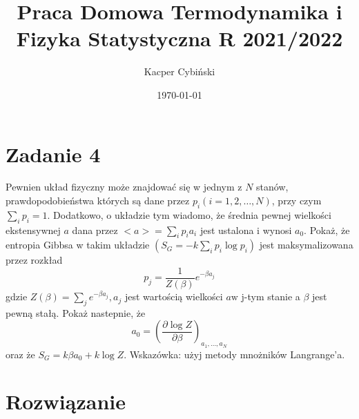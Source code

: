 \documentclass[12pt,a4paper]{article}
\title{Praca Domowa Termodynamika i Fizyka Statystyczna R 2021/2022}
\author{Kacper Cybiński}
\date{\today}
\begin{document}
\maketitle

\section{Zadanie 4}

Pewnien układ fizyczny może znajdować się w jednym z $N$ stanów, prawdopodobieństwa których są dane przez $p_{i}(i=1,2, \ldots, N)$, przy czym $\sum_{i} p_{i}=1$. Dodatkowo, o układzie tym wiadomo, że średnia pewnej wielkości ekstensywnej $a$ dana przez $<a>=\sum_{i} p_{i} a_{i}$ jest ustalona i wynosi $a_{0}$. Pokaż, że entropia Gibbsa w takim układzie $\left(S_{G}=-k \sum_{i} p_{i} \log p_{i}\right)$ jest maksymalizowana przez rozkład
$$
p_{j}=\frac{1}{Z(\beta)} e^{-\beta a_{j}}
$$
gdzie $Z(\beta)=\sum_{j} e^{-\beta a_{j}}, a_{j}$ jest wartością wielkości $a \mathrm{w}$ j-tym stanie a $\beta$ jest pewną stałą. Pokaż nastepnie, że
$$
a_{0}=\left(\frac{\partial \log Z}{\partial \beta}\right)_{a_{1}, \ldots, a_{N}}
$$
oraz że $S_{G}=k \beta a_{0}+k \log Z$. Wskazówka: użyj metody mnożników Langrange'a.


\section{Rozwiązanie}
\end{document}
